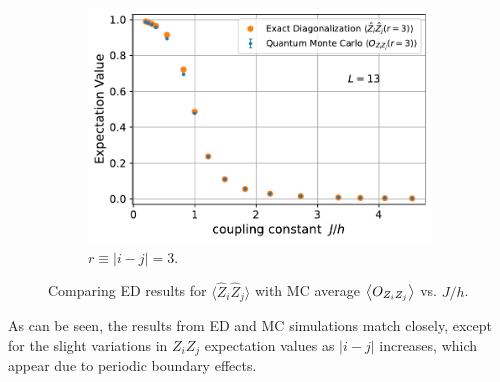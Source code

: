 \documentclass[../thesis_main.tex]{subfiles}
\begin{document}
\begin{figure}[!htb]
\begin{subfigure}[b]{0.45\textwidth}
        \centering
        \includegraphics[width=\textwidth]{images/13_site/L=13_ZZ(r=3).pdf}
        \caption{$r \equiv |i-j| = 3$.}
    \end{subfigure}
    \caption{Comparing ED results for $\langle \hat{Z}_i \hat{Z}_j \rangle$ with MC average $\expval{O_{Z_i Z_j}}$ vs. $J/h$.}
    \label{expvalZZ_ED_vs_MC_13}
\end{figure}
\FloatBarrier
\hspace{-1.5em}As can be seen, the results from ED and MC simulations match closely, except for the slight variations in $Z_i Z_j$ expectation values as $|i-j|$ increases, which appear due to periodic boundary effects.

\end{document}
